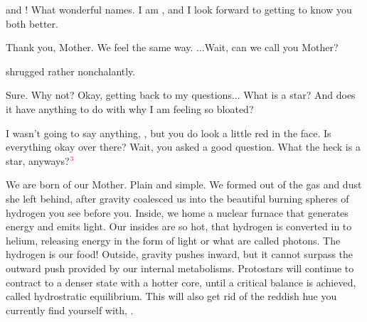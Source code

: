 \documentclass[main.tex]{subfiles}
\begin{document}
\par \Sterope \rmalpha and \rmbeta!  What wonderful names.  I am \rmsterope, and I look forward to getting to know you both better.

\par \Betab Thank you, Mother.  We feel the same way. ...Wait, can we call you Mother?

\par \nar \rmsterope shrugged rather nonchalantly.

\par \Sterope Sure.   Why not?   Okay, getting back to my questions...  What is a star?  And does it have anything to do with why I am feeling so bloated?

\par \Alcyone I wasn't going to say anything, \rmsterope, but you do look a little red in the face.  Is everything okay over there?  Wait, you asked a good question.  What the heck is a star, anyways?$^{\textcolor{red}{3}}$

\par \Maia We are born of our Mother.  Plain and simple.  We formed out of the gas and dust she left behind, after gravity coalesced us into the beautiful burning spheres of hydrogen you see before you.  Inside, we home a nuclear furnace that generates energy and emits light.  Our insides are so hot, that hydrogen is converted in to helium, releasing energy in the form of light or what are called photons.  The hydrogen is our food!  Outside, gravity pushes inward, but it cannot surpass the outward push provided by our internal metabolisms.  Protostars will continue to contract to a denser state with a hotter core, until a critical balance is achieved, called hydrostratic equilibrium.  This will also get rid of the reddish hue you currently find yourself with, \rmsterope.

\end{document}
